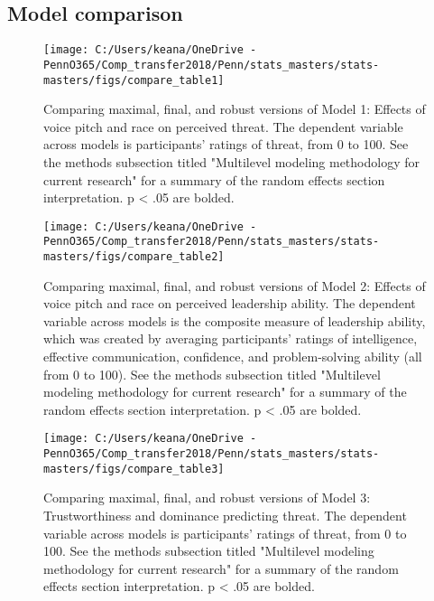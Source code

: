 \documentclass[
  english,
  man, noextraspace,floatsintext]{apa6}
\begin{document}
\hypertarget{model-comparison}{%
\subsection{Model comparison}\label{model-comparison}}

\begin{figure}

{\centering \texttt{[image: C:/Users/keana/OneDrive - PennO365/Comp\_transfer2018/Penn/stats\_masters/stats-masters/figs/compare\_table1]} 

}

\caption{Comparing maximal, final, and robust versions of Model 1: Effects of voice pitch and race on perceived threat. The dependent variable across models is participants' ratings of threat, from 0 to 100. See the methods subsection titled "Multilevel modeling methodology for current research" for a summary of the random effects section interpretation. p < .05 are bolded.}\label{fig:f11}
\end{figure}

\begin{figure}

{\centering \texttt{[image: C:/Users/keana/OneDrive - PennO365/Comp\_transfer2018/Penn/stats\_masters/stats-masters/figs/compare\_table2]} 

}

\caption{Comparing maximal, final, and robust versions of Model 2: Effects of voice pitch and race on perceived leadership ability. The dependent variable across models is the composite measure of leadership ability, which was created by averaging participants' ratings of intelligence, effective communication, confidence, and problem-solving ability (all from 0 to 100). See the methods subsection titled "Multilevel modeling methodology for current research" for a summary of the random effects section interpretation. p < .05 are bolded.}\label{fig:f12}
\end{figure}

\begin{figure}

{\centering \texttt{[image: C:/Users/keana/OneDrive - PennO365/Comp\_transfer2018/Penn/stats\_masters/stats-masters/figs/compare\_table3]} 

}

\caption{Comparing maximal, final, and robust versions of Model 3: Trustworthiness and dominance predicting threat. The dependent variable across models is participants' ratings of threat, from 0 to 100. See the methods subsection titled "Multilevel modeling methodology for current research" for a summary of the random effects section interpretation. p < .05 are bolded.}\label{fig:f13}
\end{figure}
\end{document}
